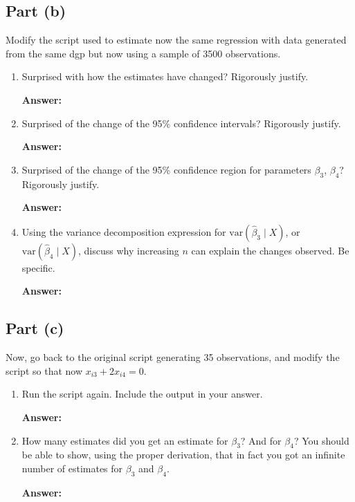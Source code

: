 \documentclass[12pt,a4paper]{article}
\begin{document}
\subsection*{Part (b)}
Modify the script used to estimate now the same regression with data generated from the same dgp but now using a sample of 3500 observations.

\begin{enumerate}[label=(\roman*)]
  \item Surprised with how the estimates have changed? Rigorously justify.
  
  \textbf{Answer:} 
  
  \item Surprised of the change of the 95\% confidence intervals? Rigorously justify.
  
  \textbf{Answer:} 
  
  \item Surprised of the change of the 95\% confidence region for parameters $\beta_3$, $\beta_4$? Rigorously justify.
  
  \textbf{Answer:} 
  
  \item Using the variance decomposition expression for $\text{var}(\hat{\beta}_3 \mid X)$, or $\text{var}(\hat{\beta}_4 \mid X)$, discuss why increasing $n$ can explain the changes observed. Be specific.
  
  \textbf{Answer:} 
\end{enumerate}

\subsection*{Part (c)}
Now, go back to the original script generating 35 observations, and modify the script so that now $x_{i3} + 2x_{i4} = 0$.

\begin{enumerate}[label=(\roman*)]
  \item Run the script again. Include the output in your answer.
  
  \textbf{Answer:} 
  
  \item How many estimates did you get an estimate for $\beta_3$? And for $\beta_4$? You should be able to show, using the proper derivation, that in fact you got an infinite number of estimates for $\beta_3$ and $\beta_4$.
  
  \textbf{Answer:} 
\end{enumerate}
\end{document}
